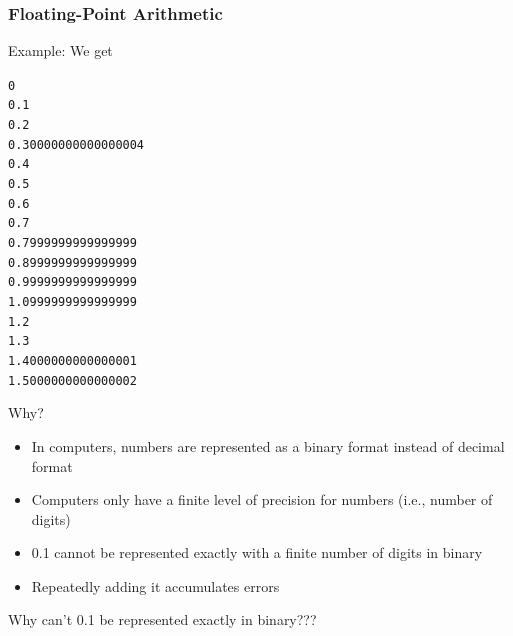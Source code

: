 \documentclass{beamer}
\newcommand{\code}[1]{\texttt{#1}}
\begin{document}
\begin{frame}	
	\frametitle{Floating-Point Arithmetic}
	
	\begin{block}{Example:}
			We get
			
			\vspace{5pt}
			
			\begin{scriptsize}
			\code{0 \\[-5pt]
			0.1 \\[-5pt]
			0.2 \\[-5pt]
			0.30000000000000004 \\[-5pt]
			0.4 \\[-5pt]
			0.5 \\[-5pt]
			0.6 \\[-5pt]
			0.7 \\[-5pt]
			0.7999999999999999 \\[-5pt]
			0.8999999999999999 \\[-5pt]
			0.9999999999999999 \\[-5pt] 
			1.0999999999999999 \\[-5pt]
			1.2 \\[-5pt]
			1.3 \\[-5pt]
			1.4000000000000001 \\[-5pt]
			1.5000000000000002
			}
			\end{scriptsize}
		\endminipage\hfill
			Why?
			\vspace{8pt}
			\begin{itemize}
				\item In computers, numbers are represented as a binary format instead of decimal format
				\item Computers only have a finite level of precision for numbers (i.e., number of digits)
				\item 0.1 cannot be represented exactly with a finite number of digits in binary
				\item Repeatedly adding it accumulates errors
			\end{itemize}
		\endminipage\hfill
		
		\vspace{10pt}
		
		Why can't 0.1 be represented exactly in binary???
	\end{block}
	
\end{frame}
\end{document}
